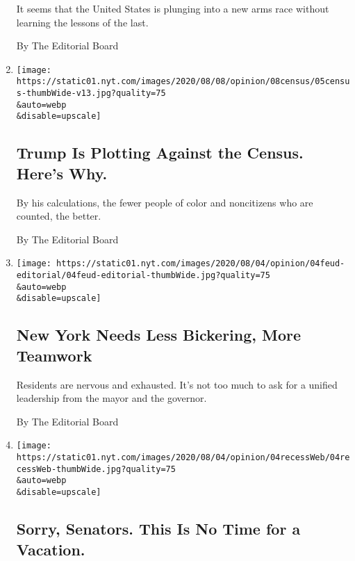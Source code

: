 \begin{enumerate}
  It seems that the United States is plunging into a new arms race
  without learning the lessons of the last.

  By The Editorial Board
\item
  \href{/2020/08/05/opinion/trump-census-2020.html}{}

  \texttt{[image: https://static01.nyt.com/images/2020/08/08/opinion/08census/05census-thumbWide-v13.jpg?quality=75\\\&auto=webp\\\&disable=upscale]}

  \hypertarget{trump-is-plotting-against-the-census-heres-why}{%
  \subsection{Trump Is Plotting Against the Census. Here's
  Why.}\label{trump-is-plotting-against-the-census-heres-why}}

  By his calculations, the fewer people of color and noncitizens who are
  counted, the better.

  By The Editorial Board
\item
  \href{/2020/08/04/opinion/cuomo-de-blasio-coronavirus-nyc.html}{}

  \texttt{[image: https://static01.nyt.com/images/2020/08/04/opinion/04feud-editorial/04feud-editorial-thumbWide.jpg?quality=75\\\&auto=webp\\\&disable=upscale]}

  \hypertarget{new-york-needs-less-bickering-more-teamwork}{%
  \subsection{New York Needs Less Bickering, More
  Teamwork}\label{new-york-needs-less-bickering-more-teamwork}}

  Residents are nervous and exhausted. It's not too much to ask for a
  unified leadership from the mayor and the governor.

  By The Editorial Board
\item
  \href{/2020/08/04/opinion/coronavirus-relief-bill-senate-recess.html}{}

  \texttt{[image: https://static01.nyt.com/images/2020/08/04/opinion/04recessWeb/04recessWeb-thumbWide.jpg?quality=75\\\&auto=webp\\\&disable=upscale]}

  \hypertarget{sorry-senators-this-is-no-time-for-a-vacation}{%
  \subsection{Sorry, Senators. This Is No Time for a
  Vacation.}\label{sorry-senators-this-is-no-time-for-a-vacation}}


\end{enumerate}

